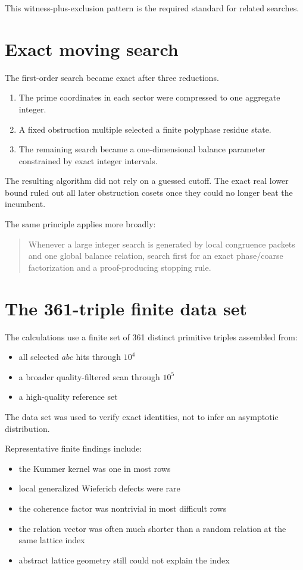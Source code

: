 This witness-plus-exclusion pattern is the required standard for related searches.

\section{Exact moving search}
The first-order search became exact after three reductions.

\begin{enumerate}[leftmargin=1.5em]
\item The prime coordinates in each sector were compressed to one aggregate integer.
\item A fixed obstruction multiple selected a finite polyphase residue state.
\item The remaining search became a one-dimensional balance parameter constrained by exact integer intervals.
\end{enumerate}

The resulting algorithm did not rely on a guessed cutoff. The exact real lower bound ruled out all later obstruction cosets once they could no longer beat the incumbent.

The same principle applies more broadly:

\begin{quote}
Whenever a large integer search is generated by local congruence packets and one global balance relation, search first for an exact phase/coarse factorization and a proof-producing stopping rule.
\end{quote}

\section{The 361-triple finite data set}
The calculations use a finite set of 361 distinct primitive triples assembled from:
\begin{itemize}[leftmargin=1.5em]
\item all selected $abc$ hits through $10^4$
\item a broader quality-filtered scan through $10^5$
\item a high-quality reference set
\end{itemize}
The data set was used to verify exact identities, not to infer an asymptotic distribution.

Representative finite findings include:
\begin{itemize}[leftmargin=1.5em]
\item the Kummer kernel was one in most rows
\item local generalized Wieferich defects were rare
\item the coherence factor was nontrivial in most difficult rows
\item the relation vector was often much shorter than a random relation at the same lattice index
\item abstract lattice geometry still could not explain the index
\end{itemize}

